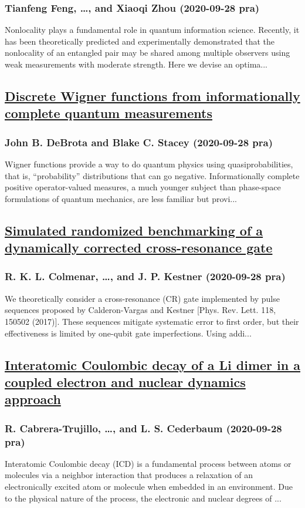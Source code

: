 \subsubsection*{Tianfeng Feng, \dots, and Xiaoqi Zhou (2020-09-28 pra)}
Nonlocality plays a fundamental role in quantum information science. Recently, it has been theoretically predicted and experimentally demonstrated that the nonlocality of an entangled pair may be shared among multiple observers using weak measurements with moderate strength. Here we devise an optima...
\subsection*{\href{http://link.aps.org/doi/10.1103/PhysRevA.102.032221}{Discrete Wigner functions from informationally complete quantum measurements}}
\subsubsection*{John B. DeBrota and Blake C. Stacey (2020-09-28 pra)}
Wigner functions provide a way to do quantum physics using quasiprobabilities, that is, “probability” distributions that can go negative. Informationally complete positive operator-valued measures, a much younger subject than phase-space formulations of quantum mechanics, are less familiar but provi...
\subsection*{\href{http://link.aps.org/doi/10.1103/PhysRevA.102.032626}{Simulated randomized benchmarking of a dynamically corrected cross-resonance gate}}
\subsubsection*{R. K. L. Colmenar, \dots, and J. P. Kestner (2020-09-28 pra)}
We theoretically consider a cross-resonance (CR) gate implemented by pulse sequences proposed by Calderon-Vargas and Kestner [Phys. Rev. Lett. 118, 150502 (2017)]. These sequences mitigate systematic error to first order, but their effectiveness is limited by one-qubit gate imperfections. Using addi...
\subsection*{\href{http://link.aps.org/doi/10.1103/PhysRevA.102.032820}{Interatomic Coulombic decay of a Li dimer in a coupled electron and nuclear dynamics approach}}
\subsubsection*{R. Cabrera-Trujillo, \dots, and L. S. Cederbaum (2020-09-28 pra)}
Interatomic Coulombic decay (ICD) is a fundamental process between atoms or molecules via a neighbor interaction that produces a relaxation of an electronically excited atom or molecule when embedded in an environment. Due to the physical nature of the process, the electronic and nuclear degrees of ...

